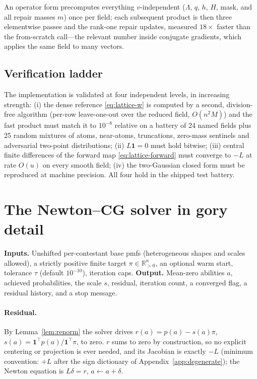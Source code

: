 \documentclass[11pt]{article}
\theoremstyle{definition}
\theoremstyle{remark}
\newcommand{\R}{\mathbb{R}}
\newcommand{\one}{\mathbf{1}}
\begin{document}
An operator form precomputes everything $v$-independent ($\Lambda$, $q$,
$h$, $H$, mask, and all repair masses $m$) once per field; each subsequent
product is then three elementwise passes and the rank-one repair updates,
measured $18\times$ faster than the from-scratch call---the relevant number
inside conjugate gradients, which applies the same field to many vectors.

\subsection{Verification ladder}

The implementation is validated at four independent levels, in increasing
strength: (i) the dense reference \eqref{eq:lattice-w} is computed by a
second, division-free algorithm (per-row leave-one-out over the reduced
field, $O(n^2M)$) and the fast product must match it to $10^{-8}$ relative
on a battery of 24 named fields plus 25 random mixtures of atoms,
near-atoms, truncations, zero-mass sentinels and adversarial two-point
distributions; (ii) $L\one = 0$ must hold bitwise; (iii) central finite
differences of the forward map \eqref{eq:lattice-forward} must converge to
$-L$ at rate $O(u)$ on every smooth field; (iv) the two-Gaussian closed
form must be reproduced at machine precision.  All four hold in the shipped
test battery.

\section{The Newton--CG solver in gory detail}
\label{app:newton}

\textbf{Inputs.}  Unshifted per-contestant base pmfs (heterogeneous shapes
and scales allowed), a strictly positive finite target $\pi \in \R^n_{>0}$,
an optional warm start, tolerance $\tau$ (default $10^{-10}$), iteration
caps.  \textbf{Output.}  Mean-zero abilities $a$, achieved probabilities,
the scale $s$, residual, iteration count, a converged flag, a residual
history, and a stop message.

\paragraph{Residual.}
By Lemma~\ref{lem:renorm} the solver drives
$r(a) = p(a) - s(a)\pi$, $s(a) = \one^\top p(a)/\one^\top\pi$, to zero.
$r$ sums to zero by construction, so no explicit centering or projection is
ever needed, and its Jacobian is exactly $-L$ (minimum convention: $+L$
after the sign dictionary of Appendix~\ref{app:degenerate}); the Newton
equation is $L\delta = r$, $a \gets a + \delta$.
\end{document}

